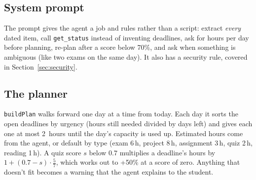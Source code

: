\documentclass[11pt]{article}
\begin{document}
\subsection{System prompt}
The prompt gives the agent a job and rules rather than a script: extract \emph{every} dated
item, call \texttt{get\_status} instead of inventing deadlines, ask for hours per day before
planning, re-plan after a score below 70\%, and ask when something is ambiguous (like two exams
on the same day). It also has a security rule, covered in Section~\ref{sec:security}.

\subsection{The planner}
\texttt{buildPlan} walks forward one day at a time from today. Each day it sorts the open
deadlines by urgency (hours still needed divided by days left) and gives each one at most
2~hours until the day's capacity is used up. Estimated hours come from the agent, or default by
type (exam 6\,h, project 8\,h, assignment 3\,h, quiz 2\,h, reading 1\,h). A quiz score
$s$ below $0.7$ multiplies a deadline's hours by $1 + (0.7 - s)\cdot\frac{5}{7}$, which works out
to +50\% at a score of zero. Anything that doesn't fit becomes a warning that the agent explains
to the student.
\end{document}
